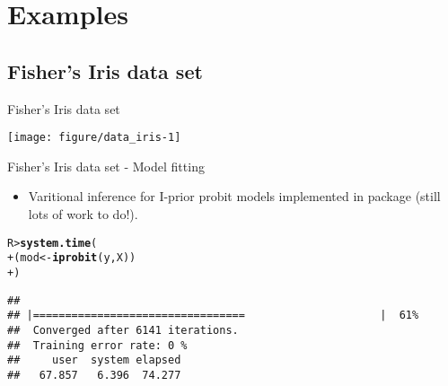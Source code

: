 \documentclass{beamer}\usepackage[]{graphicx}\usepackage[]{color}
\makeatletter
\def\maxwidth{ %
  \ifdim\Gin@nat@width>\linewidth
    \linewidth
  \else
    \Gin@nat@width
  \fi
}
\newcommand{\hlstd}[1]{\textcolor[rgb]{0.345,0.345,0.345}{#1}}%
\newcommand{\hlkwb}[1]{\textcolor[rgb]{0.69,0.353,0.396}{#1}}%
\newcommand{\hlkwd}[1]{\textcolor[rgb]{0.737,0.353,0.396}{\textbf{#1}}}%
\newenvironment{kframe}{%
 \def\at@end@of@kframe{}%
 \ifinner\ifhmode%
  \def\at@end@of@kframe{\end{minipage}}%
  \begin{minipage}{\columnwidth}%
 \fi\fi%
 \def\FrameCommand##1{\hskip\@totalleftmargin \hskip-\fboxsep
 \colorbox{shadecolor}{##1}\hskip-\fboxsep
     \hskip-\linewidth \hskip-\@totalleftmargin \hskip\columnwidth}%
 \MakeFramed {\advance\hsize-\width
   \@totalleftmargin\z@ \linewidth\hsize
   \@setminipage}}%
 {\par\unskip\endMakeFramed%
 \at@end@of@kframe}
\newenvironment{knitrout}{}{} %
\makeatother
\begin{document}
\ifstandalone
  \section{Examples}
\fi

\subsection*{Fisher's Iris data set}

\begin{frame}[fragile]{Fisher's Iris data set}
\begin{knitrout}\small
{}\color{fgcolor}

{\centering \texttt{[image: figure/data\_iris-1]} 

}



\end{knitrout}
\end{frame}


\begin{frame}[fragile]{Fisher's Iris data set - Model fitting}
\vspace{-13pt}
\begin{itemize}
\item Varitional inference for I-prior probit models implemented in  package  (still lots of work to do!).
\end{itemize}
\begin{knitrout}\small
{}\color{fgcolor}\begin{kframe}
\begin{alltt}
\hlstd{R> }\hlkwd{system.time}\hlstd{(}
\hlstd{+ }  \hlstd{(mod} \hlkwb{<-} \hlkwd{iprobit}\hlstd{(y, X))}
\hlstd{+ }\hlstd{)}
\end{alltt}
\end{kframe}
\end{knitrout}
\vspace{-25pt}
\begin{knitrout}\small
{}\color{fgcolor}\begin{kframe}
\begin{alltt}
\vspace{0.8em}
\end{alltt}
\end{kframe}
\end{knitrout}
\vspace{-25pt}
\begin{knitrout}\small
{}\color{fgcolor}\begin{kframe}
\begin{verbatim}
## 
## |=================================                     |  61%
##  Converged after 6141 iterations.
##  Training error rate: 0 %
##     user  system elapsed
##   67.857   6.396  74.277
\end{verbatim}
\end{kframe}
\end{knitrout}

\end{frame}
\end{document}
